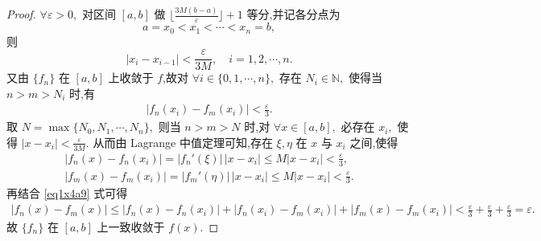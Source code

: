 \documentclass[../../main.tex]{subfiles}%
\begin{document}
\begin{proof}
\(\forall \varepsilon >0,\) 对区间 \([a,b]\) 做 \(\lfloor \frac{3M(b-a)}{\varepsilon} \rfloor +1\) 等分,并记各分点为
$$a=x_0<x_1<\cdots <x_n=b,$$
则
$$|x_i-x_{i-1}|<\frac{\varepsilon}{3M},\quad i=1,2,\cdots ,n.$$
又由 \(\{f_n\}\) 在 \([a,b]\) 上收敛于 \(f\),故对 \(\forall i\in \{0,1,\cdots ,n\},\) 存在 \(N_i\in \mathbb{N},\) 使得当 $n>m>N_i$ 时,有
\begin{align}
|f_n(x_i)-f_m(x_i)|<\frac{\varepsilon}{3}. \label{eq1x4a9}
\end{align}
取 $N=\max \{N_0,N_1,\cdots ,N_n\},$ 则当 $n>m>N$ 时,对 \(\forall x\in [a,b],\) 必存在 \(x_i,\) 使得 $|x-x_i|<\frac{\varepsilon}{3M}.$
从而由 Lagrange 中值定理可知,存在 \(\xi ,\eta\) 在 \(x\) 与 \(x_i\) 之间,使得
\begin{align*}
|f_n(x)-f_n(x_i)|=|f_n'(\xi)|\,|x-x_i|\leqslant M|x-x_i|<\frac{\varepsilon}{3}, \\
|f_m(x)-f_m(x_i)|=|f_m'(\eta)|\,|x-x_i|\leqslant M|x-x_i|<\frac{\varepsilon}{3}.
\end{align*}
再结合 \eqref{eq1x4a9} 式可得
\begin{align*}
|f_n(x)-f_m(x)|\leqslant |f_n(x)-f_n(x_i)|+|f_n(x_i)-f_m(x_i)|+|f_m(x)-f_m(x_i)|<\frac{\varepsilon}{3}+\frac{\varepsilon}{3}+\frac{\varepsilon}{3}=\varepsilon .
\end{align*}
故 \(\{f_n\}\) 在 \([a,b]\) 上一致收敛于 \(f(x).\)\end{proof}
\end{document}
